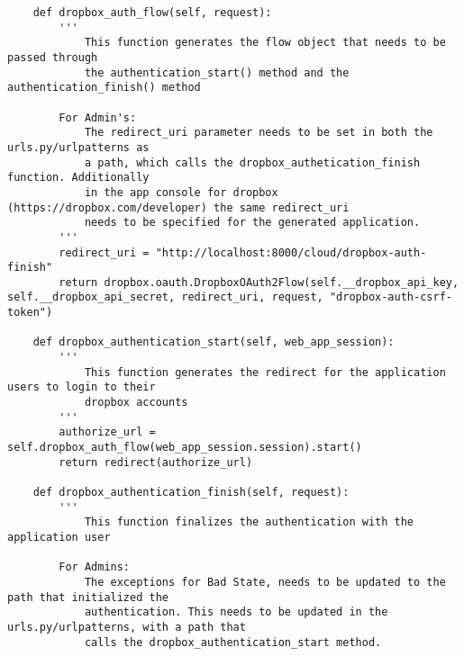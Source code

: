\documentclass{article}
\begin{document}
\begin{verbatim}
    def dropbox_auth_flow(self, request):
        '''
            This function generates the flow object that needs to be passed through
            the authentication_start() method and the authentication_finish() method
        
        For Admin's:
            The redirect_uri parameter needs to be set in both the urls.py/urlpatterns as
            a path, which calls the dropbox_authetication_finish function. Additionally
            in the app console for dropbox (https://dropbox.com/developer) the same redirect_uri
            needs to be specified for the generated application. 
        '''
        redirect_uri = "http://localhost:8000/cloud/dropbox-auth-finish"
        return dropbox.oauth.DropboxOAuth2Flow(self.__dropbox_api_key, self.__dropbox_api_secret, redirect_uri, request, "dropbox-auth-csrf-token")

    def dropbox_authentication_start(self, web_app_session):
        '''
            This function generates the redirect for the application users to login to their 
            dropbox accounts
        '''
        authorize_url = self.dropbox_auth_flow(web_app_session.session).start()
        return redirect(authorize_url)

    def dropbox_authentication_finish(self, request):
        '''
            This function finalizes the authentication with the application user
            
        For Admins:
            The exceptions for Bad State, needs to be updated to the path that initialized the 
            authentication. This needs to be updated in the urls.py/urlpatterns, with a path that 
            calls the dropbox_authentication_start method.


\end{verbatim}
\end{document}
